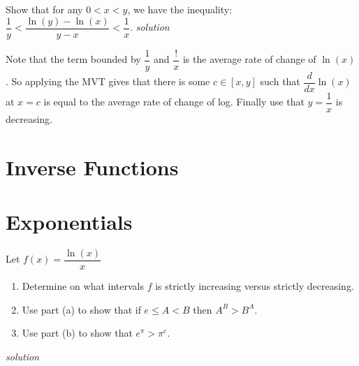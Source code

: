 \documentclass{amsbook}
\begin{document}
\begin{Answer}[ref={7a2}]

\end{Answer}

\begin{Exercise}[title={}, difficulty=0, label=7a3]


\end{Exercise}

\begin{Answer}

\end{Answer}

\begin{Exercise}[title={A Nice Bound for Log}, difficulty=2, label=7a1]
Show that for any $0<x<y$, we have the inequality:\\[.5cm] $\dfrac{1}{y} < \dfrac{\ln(y)-\ln(x)}{y-x}< \dfrac{1}{x}$.
 \hfill \emph{solution} 

\end{Exercise}

\begin{Answer}[ref={7a1}]
	Note that the term bounded by $\dfrac{1}{y}$ and $\dfrac{!}{x}$ is the average rate of change of $\ln(x)$. So applying the MVT gives that there is some $c\in [x,y]$ such that $\dfrac{d}{dx} \ln(x)$ at $x=c$ is equal to the average rate of change of log. Finally use that $y=\dfrac{1}{x}$ is decreasing.
	
\end{Answer}


\section{Inverse Functions}

\section{Exponentials}

\begin{Exercise}[title={$x^y$ vs $y^x$}, difficulty=2, label=7c1]
Let $f(x)=\dfrac{\ln(x)}{x}$
\begin{enumerate}
	\item Determine on what intervals $f$ is strictly increasing versus strictly decreasing.\\
	\item Use part (a) to show that if $e \leq A < B$ then $A^B > B^A$.\\
	\item Use part (b) to show that $e^\pi > \pi^e$.\\
\end{enumerate}
\hfill \emph{solution} 
\end{Exercise}
\end{document}
